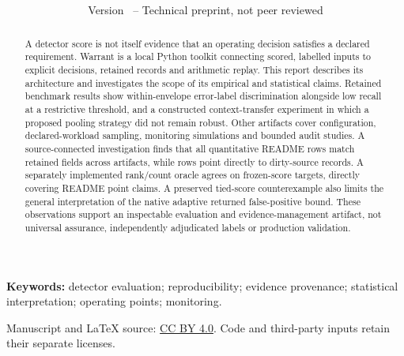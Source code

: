 \documentclass[11pt]{article}
\title{\vspace{-10mm}\textbf{\PaperTitle}}
\author{\PaperAuthor\\\small \PaperAffiliation}
\date{\PaperDate\\[3pt]\small Version \PaperVersion\ -- Technical preprint, not peer reviewed}
\begin{document}
\maketitle
\thispagestyle{plain}
\begin{abstract}
A detector score is not itself evidence that an operating decision satisfies a
declared requirement. Warrant is a local Python toolkit connecting scored,
labelled inputs to explicit decisions, retained records and arithmetic replay.
This report describes its architecture and investigates the scope of its
empirical and statistical claims. Retained benchmark results show within-envelope
error-label discrimination alongside low recall at a restrictive threshold,
and a constructed context-transfer experiment in which a proposed pooling
strategy did not remain robust. Other artifacts cover configuration,
declared-workload sampling, monitoring simulations and bounded audit studies.
A source-connected investigation finds that all \AuditClaims{} quantitative
README rows match retained fields across \AuditArtifacts{} artifacts, while
\DirtyClaims{} rows point directly to dirty-source records. A separately
implemented rank/count oracle agrees on \PointTargets{} frozen-score targets,
directly covering \DirectPointClaims{} README point claims. A preserved
tied-score counterexample also limits the general interpretation of the native
adaptive returned false-positive bound. These observations support an
inspectable evaluation and evidence-management artifact, not universal
assurance, independently adjudicated labels or production validation.
\end{abstract}
\noindent\textbf{Keywords:} detector evaluation; reproducibility; evidence
provenance; statistical interpretation; operating points; monitoring.

\noindent\small Manuscript and LaTeX source:
\href{https://creativecommons.org/licenses/by/4.0/}{CC BY 4.0}.
Code and third-party inputs retain their separate licenses.\normalsize






\begingroup\small

\endgroup
\end{document}

